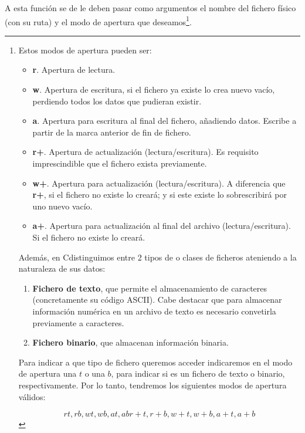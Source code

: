 \documentclass[a4paper, 11pt, titlepage]{article}
\begin{document}
            A esta función se de le deben pasar como argumentos el nombre del fichero físico (con su ruta)
            y el modo de apertura que deseamos\footnote{
                Estos modos de apertura pueden ser:

                \begin{itemize}
                    \item \textbf{r}. Apertura de lectura.
                    \item \textbf{w}. Apertura de escritura, si el fichero ya existe lo crea nuevo vacío,
                    perdiendo todos los datos que pudieran existir.
                    \item \textbf{a}. Apertura para escritura al final del fichero, añadiendo datos. Escribe 
                    a partir de la marca anterior de fin de fichero.
                    \item \textbf{r+}. Apertura de actualización (lectura/escritura). Es requisito imprescindible
                    que el fichero exista previamente.
                    \item \textbf{w+}. Apertura para actualización (lectura/escritura). A diferencia que \textbf{r+},
                    si el fichero no existe lo creará; y si este existe lo sobrescribirá por uno nuevo vacío.
                    \item \textbf{a+}. Apertura para actualización al final del archivo (lectura/escritura). Si el 
                    fichero no existe lo creará.
                \end{itemize}

                Además, en Cdistinguimos entre 2 tipos de o clases de ficheros ateniendo 
                a la naturaleza de sus datos:

                \begin{enumerate}
                    \item \textbf{Fichero de texto}, que permite el almacenamiento de caracteres (concretamente 
                    su código ASCII). Cabe destacar que para almacenar información numérica en un archivo de texto 
                    es necesario convetirla previamente a caracteres.
                    \item \textbf{Fichero binario}, que almacenan información binaria.
                \end{enumerate}

                Para indicar a que tipo de fichero queremos acceder indicaremos en el modo de apertura una $t$ o 
                una $b$, para indicar si es un fichero de texto o binario, respectivamente. Por lo tanto, tendremos
                los siguientes modos de apertura válidos:

                \[rt, rb, wt, wb, at, ab r+t, r+b, w+t, w+b, a+t, a+b\]
            }.
\end{document}
